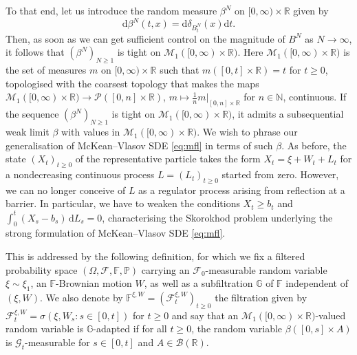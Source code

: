 \documentclass[11pt, a4paper]{article}
\theoremstyle{plain}
\theoremstyle{definition}
\theoremstyle{remark}
\numberwithin{equation}{section}
\newcommand{\pr}{\mathbb{P}}
\newcommand{\R}{\mathbb{R}}
\renewcommand{\P}{\mathcal{P}}
\newcommand{\F}{\mathcal{F}}
\renewcommand{\d}{\mathrm{d}}
\newcommand{\define}{\mathpunct{:}}
\newcommand{\bb}[1]{\mathbb{#1}}
\renewcommand{\cal}[1]{\mathcal{#1}}
\begin{document}
To that end, let us introduce the random measure $\beta^N$ on $[0, \infty) \times \R$ given by
\begin{equation*}
    \d \beta^N(t, x) = \d \delta_{B^N_t}(x) \d t.
\end{equation*}
Then, as soon as we can get sufficient control on the magnitude of $B^N$ as $N \to \infty$, it follows that $(\beta^N)_{N \geq 1}$ is tight on $\cal{M}_1([0, \infty) \times \R)$. Here $\cal{M}_1([0, \infty) \times \R)$ is the set of measures $m$ on $[0, \infty) \times \R$ such that $m([0, t] \times \R) = t$ for $t \geq 0$, topologised with the coarsest topology that makes the maps $\cal{M}_1([0, \infty) \times \R) \to \P([0, n] \times \R)$, $m \mapsto \frac{1}{n} m \vert_{[0, n] \times \R}$ for $n \in \bb{N}$, continuous. If the sequence $(\beta^N)_{N \geq 1}$ is tight on $\cal{M}_1([0, \infty) \times \R)$, it admits a subsequential weak limit $\beta$ with values in $\cal{M}_1([0, \infty) \times \R)$. We wish to phrase our generalisation of McKean--Vlasov SDE \eqref{eq:mfl} in terms of such $\beta$. As before, the state $(X_t)_{t \geq 0}$ of the representative particle takes the form $X_t = \xi + W_t + L_t$ for a nondecreasing continuous process $L = (L_t)_{t \geq 0}$ started from zero. However, we can no longer conceive of $L$ as a regulator process arising from reflection at a barrier. In particular, we have to weaken the conditions $X_t \geq b_t$ and $\int_0^t (X_s - b_s) \, \d L_s = 0$, characterising the Skorokhod problem underlying the strong formulation of McKean--Vlasov SDE \eqref{eq:mfl}. 

This is addressed by the following definition, for which we fix a filtered probability space $(\Omega, \F, \bb{F}, \pr)$ carrying an $\F_0$-measurable random variable $\xi \sim \xi_1$, an $\bb{F}$-Brownian motion $W$, as well as a subfiltration $\bb{G}$ of $\bb{F}$ independent of $(\xi, W)$. We also denote by $\bb{F}^{\xi, W} = (\F^{\xi, W}_t)_{t \geq 0}$ the filtration given by $\F^{\xi, W}_t = \sigma(\xi, W_s \define s \in [0, t])$ for $t \geq 0$ and say that an $\cal{M}_1([0, \infty) \times \R)$-valued random variable is $\bb{G}$-adapted if for all $t \geq 0$, the random variable $\beta([0, s] \times A)$ is $\cal{G}_t$-measurable for $s \in [0, t]$ and $A \in \cal{B}(\R)$.
\end{document}
